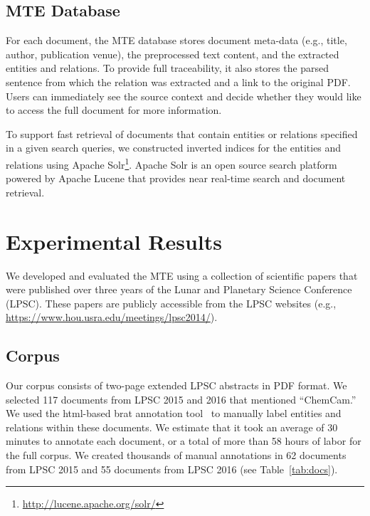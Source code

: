 \documentclass[letterpaper]{article} %
\begin{document}

\subsection{MTE Database}

For each document, the MTE database stores document meta-data (e.g.,
title, author, publication venue), the preprocessed text content, and
the extracted entities and relations.  To provide full traceability,
it also stores the parsed sentence from which the relation was
extracted and a link to the original PDF.  Users can immediately see
the source context and decide whether they would like to access the
full document for more information.
 
To support fast retrieval of
documents that contain entities or relations specified in a given
search queries, we constructed inverted indices for the entities and
relations using Apache
Solr\footnote{\url{http://lucene.apache.org/solr/}}. Apache Solr is an
open source search platform powered by Apache Lucene that provides
near real-time search and document retrieval. 
 
\section{Experimental Results}

We developed and evaluated the MTE using a collection of scientific
papers that were published over three years of the Lunar and Planetary
Science Conference (LPSC).  These papers are publicly accessible from
the LPSC websites
(e.g., \url{https://www.hou.usra.edu/meetings/lpsc2014/}). 

\subsection{Corpus}

Our corpus consists of two-page extended LPSC abstracts in PDF format.
We selected 117 documents from LPSC 2015 and 2016 that mentioned
``ChemCam.''  We used the html-based brat annotation tool~\cite{brat}
to manually label entities and relations within these documents.  We
estimate that it took an average of 30 minutes to annotate each
document, or a total of more than 58 hours of labor for the full
corpus.  We created thousands of manual annotations in 62 documents
from LPSC 2015 and 55 documents from LPSC 2016 (see
Table~\ref{tab:docs}).
\end{document}
